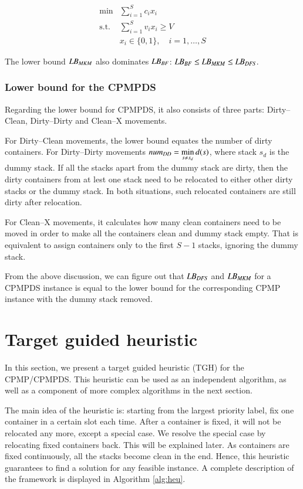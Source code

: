 \documentclass[review,3p,times,authoryear,12pt]{elsarticle}
\begin{document}
\begin{equation}
\label{equ:4}
\begin{array}{rl}
\min & \sum_{i=1}^S c_i x_i\\
\mathrm{s.t.} &\sum_{i=1}^S v_i x_i\ge V\\
&x_i\in\{0,1\}, \quad i=1,\dots,S
\end{array}
\end{equation}

The lower bound $\id{LB}_\id{MKM}$ also dominates $\id{LB}_\id{BF}$: $\id{LB}_\id{BF}\le \id{LB}_\id{MKM}\le \id{LB}_\id{DFS}$.

\subsubsection{Lower bound for the CPMPDS}

Regarding the lower bound for CPMPDS, it also consists of three parts: Dirty--Clean, Dirty--Dirty and Clean--X movements.

For Dirty--Clean movements, the lower bound equates the number of dirty containers. For Dirty--Dirty movements $\id{num}_\id{DD}=\min\limits_{s\neq s_d} d(s)$, where stack $s_d$ is the dummy stack. If all the stacks apart from the dummy stack are dirty, then the dirty containers from at lest one stack need to be relocated to either other dirty stacks or the dummy stack. In both situations, such relocated containers are still dirty after relocation.

For Clean--X movements, it calculates how many clean containers need to be moved in order to make all the containers clean and dummy stack empty. That is equivalent to assign containers only to the first $S-1$ stacks, ignoring the dummy stack.

From the above discussion, we can figure out that $\id{LB}_\id{DFS}$ and $\id{LB}_\id{MKM}$ for a CPMPDS instance is equal to the lower bound for the corresponding CPMP instance with the dummy stack removed.

\section{Target guided heuristic}
\label{sec:heu}

In this section, we present a target guided heuristic (TGH) for the CPMP/CPMPDS. This heuristic can be used as an independent algorithm, as well as a component of more complex algorithms in the next section.

The main idea of the heuristic is: starting from the largest priority label, fix one container in a certain slot each time. After a container is fixed, it will not be relocated any more, except a special case. We resolve the special case by relocating fixed containers back. This will be explained later.
As containers are fixed continuously, all the stacks become clean in the end. Hence, this heuristic guarantees to find a solution for any feasible instance. A complete description of the framework is displayed in Algorithm \ref{alg:heu}.
\end{document}
